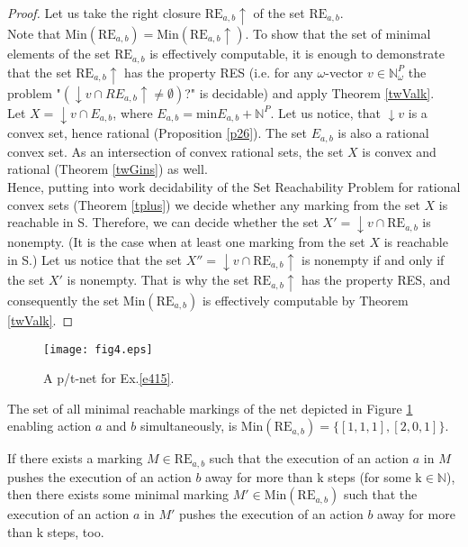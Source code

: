 \documentclass[a4paper]{llncs}
\begin{document}
\begin{proof}
Let us take the right closure $\mathrm{RE}_{a,b}\uparrow$ of the set $\mathrm{RE}_{a,b}$.
\\Note that $\mathrm{Min}(\mathrm{RE}_{a,b})=\mathrm{Min}(\mathrm{RE}_{a,b}\uparrow)$. To show that the set of minimal elements of the set $\mathrm{RE}_{a,b}$ is effectively computable, it is enough to demonstrate that the set $\mathrm{RE}_{a,b}\uparrow$  has the property RES (i.e. for any  $\omega$-vector $v\in \mathbb{N}_\omega^{P}$ the problem "$(\downarrow  v\cap RE_{a,b}\uparrow \neq \emptyset)$?" is decidable) and apply Theorem \ref{twValk}. \\
Let $X=\downarrow v\cap E_{a,b}$, where $E_{a,b}=\mathrm{min}E_{a,b}+ \mathbb{N}^{P}$. Let us notice, that  $\downarrow v$ is a convex set, hence rational (Proposition \ref{p26}). The set $E_{a,b}$ is also a rational convex set. As an intersection of convex rational sets, the set $X$ is convex and rational (Theorem \ref{twGins}) as well.\\
Hence, putting into work decidability of the Set Reachability Problem for rational convex sets (Theorem \ref{tplus}) we decide whether any marking from the set $X$ is reachable in S. Therefore, we can decide whether the set $X'= \downarrow v\cap \mathrm{RE}_{a,b}$ is nonempty. (It is the case when at least one marking from the set $X$ is reachable in S.) Let us notice that the set $X''=\downarrow v\cap \mathrm{RE}_{a,b}\uparrow$  is nonempty if and only if the set $X'$ is nonempty. That is why the set $\mathrm{RE}_{a,b}\uparrow$  has the property RES, and consequently the set $\mathrm{Min}(\mathrm{RE}_{a,b})$ is effectively computable by Theorem \ref{twValk}. 	
\end{proof}

\begin{example}
\label{e415}

\begin{figure}[h]
\centering
\texttt{[image: fig4.eps]}
\caption{A p/t-net for Ex.\ref{e415}.}
\label{Fig4}
\end{figure}


The set of all minimal reachable markings of the net depicted in Figure \ref{Fig4} enabling action $a$ and $b$ simultaneously, is $\mathrm{Min}(\mathrm{RE}_{a,b})=\{[1,1,1], [2,0,1]\}$.
\end{example}

\begin{proposition}
\label{p416}
If there exists a marking  $M \in\mathrm{RE}_{a,b}$ such that the execution of an action $a$ in $M$ pushes the execution of an action $b$ away for more than $\mathrm{k}$ steps (for some $\mathrm{k}\in\mathbb{N}$), then there exists some minimal marking  $M'\in\mathrm{Min}(\mathrm{RE}_{a,b})$ such that the execution of an action $a$ in $M'$ pushes the execution of an action $b$ away for more than $\mathrm{k}$ steps, too.
\end{proposition}
\end{document}
